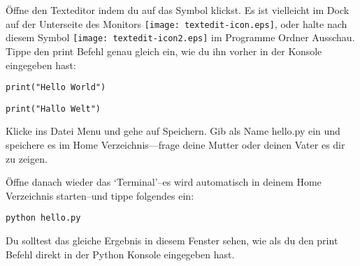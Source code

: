 \begin{MAC}
Öffne den Texteditor indem du auf das Symbol klickst. Es ist vielleicht im Dock auf der Unterseite des Monitors \texttt{[image: textedit-icon.eps]}, oder halte nach diesem Symbol \texttt{[image: textedit-icon2.eps]} im Programme Ordner Ausschau. Tippe den print Befehl genau gleich ein, wie du ihn vorher in der Konsole eingegeben hast:

\begin{listing}
\begin{verbatim}
print("Hello World")
\end{verbatim}
\end{listing}
\begin{listing}
\begin{verbatim}
print("Hallo Welt")
\end{verbatim}
\end{listing}

Klicke ins Datei Menu und gehe auf Speichern. Gib als Name hello.py ein und speichere es im Home Verzeichnis---frage deine Mutter oder deinen Vater es dir zu zeigen.

Öffne danach wieder das `Terminal'--es wird automatisch in deinem Home Verzeichnis starten--und tippe folgendes ein:

\begin{listing}
\begin{verbatim}
python hello.py
\end{verbatim}
\end{listing}

Du solltest das gleiche Ergebnis in diesem Fenster sehen, wie als du den print Befehl direkt in der Python Konsole eingegeben hast.

\end{MAC}

